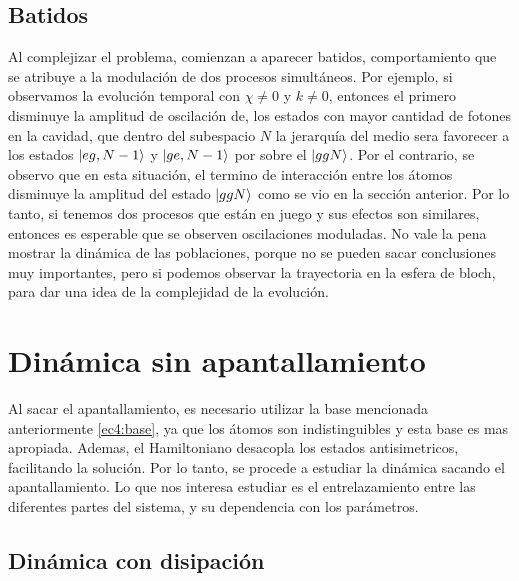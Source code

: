 \subsection{Batidos}

Al complejizar el problema, comienzan a aparecer batidos, comportamiento que se atribuye a la modulación de dos procesos simultáneos. Por ejemplo, si observamos la evolución temporal con $\chi\neq0$ y $k\neq0$, entonces el primero disminuye la amplitud de oscilación de, los estados con mayor cantidad de fotones en la cavidad, que dentro del subespacio $N$ la jerarquía del medio sera favorecer a los estados $\ket{eg,N-1}$ y $\ket{ge,N-1}$ por sobre el $\ket{ggN}$. Por el contrario, se observo que en esta situación, el termino de interacción entre los átomos disminuye la amplitud del estado $\ket{ggN}$ como se vio en la sección anterior. Por lo tanto, si tenemos dos procesos que están en juego y sus efectos son similares, entonces es esperable que se observen oscilaciones moduladas. No vale la pena mostrar la dinámica de las poblaciones, porque no se pueden sacar conclusiones muy importantes, pero si podemos observar la trayectoria en la esfera de bloch, para dar una idea de la complejidad de la evolución.

\section{Dinámica sin apantallamiento}

Al sacar el apantallamiento, es necesario utilizar la base mencionada anteriormente \ref{ec4:base}, ya que los átomos son indistinguibles y esta base es mas apropiada. Ademas, el Hamiltoniano desacopla los estados antisimetricos, facilitando la solución. Por lo tanto, se procede a estudiar la dinámica sacando el apantallamiento. Lo que nos interesa estudiar es el entrelazamiento entre las diferentes partes del sistema, y su dependencia con los parámetros. 

\subsection{Dinámica con disipación}

